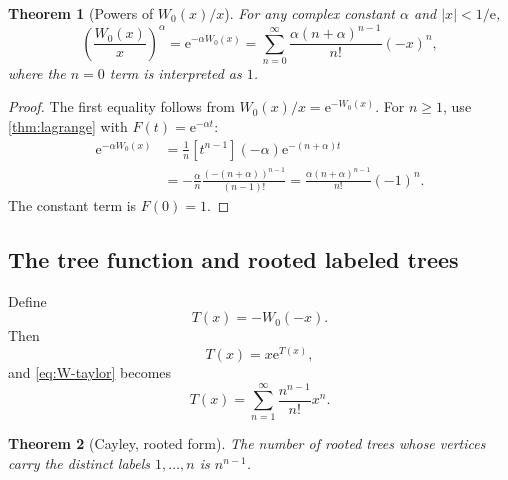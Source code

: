 \documentclass[11pt]{article}
\numberwithin{equation}{section}
\newtheorem{theorem}{Theorem}[section]
\theoremstyle{definition}
\theoremstyle{remark}
\newcommand{\e}{\mathrm e}
\begin{document}
\begin{theorem}[Powers of $W_0(x)/x$]
\label{thm:W-over-x-alpha}
For any complex constant $\alpha$ and $|x|<1/\e$,
\begin{equation}
 \left(\frac{W_0(x)}x\right)^\alpha
 =\e^{-\alpha W_0(x)}
 =\sum_{n=0}^{\infty}
   \frac{\alpha(n+\alpha)^{n-1}}{n!}(-x)^n,           \label{eq:generalized-tree-series}
\end{equation}
where the $n=0$ term is interpreted as $1$.
\end{theorem}

\begin{proof}
The first equality follows from $W_0(x)/x=\e^{-W_0(x)}$.  For $n\ge1$, use
\cref{thm:lagrange} with $F(t)=\e^{-\alpha t}$:
\begin{align*}
[x^n]\e^{-\alpha W_0(x)}
 &=\frac1n[t^{n-1}](-\alpha)
       \e^{-(n+\alpha)t}\\
 &=-\frac\alpha n\frac{(-(n+\alpha))^{n-1}}{(n-1)!}
 =\frac{\alpha(n+\alpha)^{n-1}}{n!}(-1)^n.
\end{align*}
The constant term is $F(0)=1$.
\end{proof}

\subsection{The tree function and rooted labeled trees}

Define
\begin{equation}
  T(x)=-W_0(-x).                                       \label{eq:tree-function}
\end{equation}
Then
\begin{equation}
  T(x)=x\e^{T(x)},                                     \label{eq:tree-functional}
\end{equation}
and \eqref{eq:W-taylor} becomes
\begin{equation}
  T(x)=\sum_{n=1}^{\infty}\frac{n^{n-1}}{n!}x^n.      \label{eq:tree-series}
\end{equation}
\begin{theorem}[Cayley, rooted form]
\label{thm:cayley}
The number of rooted trees whose vertices carry the distinct labels
$1,\ldots,n$ is $n^{n-1}$.
\end{theorem}
\end{document}
